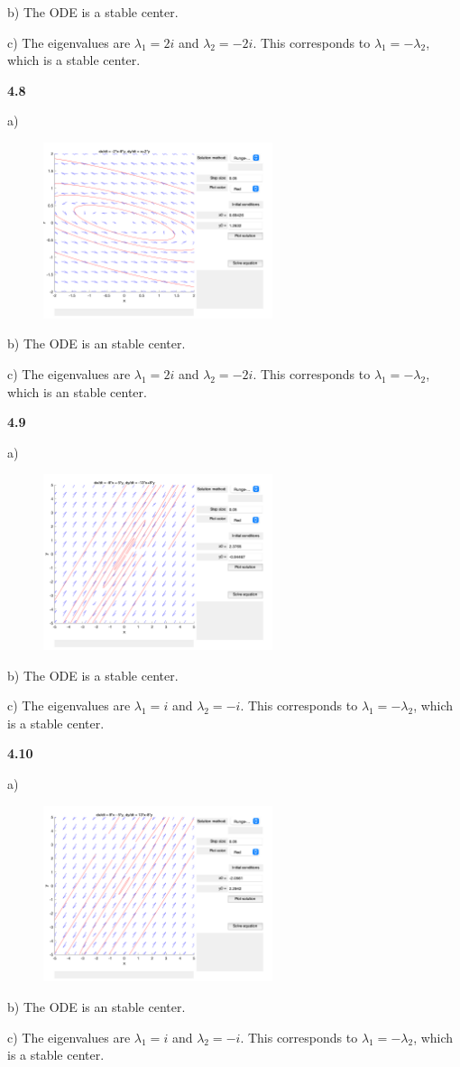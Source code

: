\documentclass[12pt]{article}
\begin{document}
b) The ODE is a stable center.

c) The eigenvalues are $\lambda_1 = 2i$ and $\lambda_2 = -2i$. This corresponds to $\lambda_1 = -\lambda_2$, which is a stable center.

\textbf{4.8}

a) \begin{figure}[H]
    \centering
    \includegraphics[width=0.6\textwidth]{images/4.8.png}
\end{figure}

b) The ODE is an stable center.

c) The eigenvalues are $\lambda_1 = 2i$ and $\lambda_2 = -2i$. This corresponds to $\lambda_1 = -\lambda_2$, which is an stable center.

\textbf{4.9}

a) \begin{figure}[H]
    \centering
    \includegraphics[width=0.6\textwidth]{images/4.9.png}
\end{figure}

b) The ODE is a stable center.

c) The eigenvalues are $\lambda_1 = i$ and $\lambda_2 = -i$. This corresponds to $\lambda_1 = -\lambda_2$, which is a stable center.

\textbf{4.10}

a) \begin{figure}[H]
    \centering
    \includegraphics[width=0.6\textwidth]{images/4.10.png}
\end{figure}

b) The ODE is an stable center.

c) The eigenvalues are $\lambda_1 = i$ and $\lambda_2 = -i$. This corresponds to $\lambda_1 = -\lambda_2$, which is a stable center.
\end{document}
